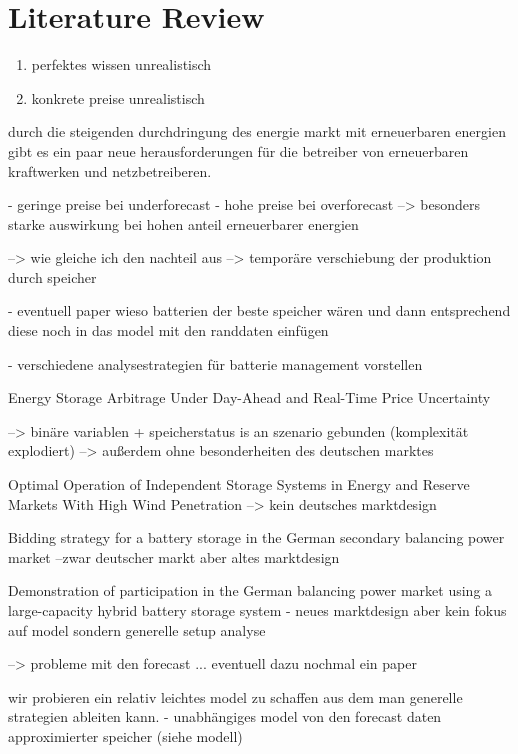 \chapter{Literature Review}
\begin{enumerate}
	\item perfektes wissen unrealistisch
	\item konkrete preise unrealistisch
\end{enumerate}

durch die steigenden durchdringung des energie markt mit erneuerbaren  energien gibt es ein paar neue herausforderungen für
die betreiber von erneuerbaren kraftwerken und netzbetreiberen.

- geringe preise bei underforecast
- hohe preise bei overforecast
--> besonders starke auswirkung bei hohen anteil erneuerbarer energien

--> wie gleiche ich den nachteil aus
--> temporäre verschiebung der produktion durch speicher

- eventuell paper wieso batterien der beste speicher wären und dann entsprechend diese noch in das model mit den  randdaten einfügen

- verschiedene analysestrategien für batterie management vorstellen

Energy Storage Arbitrage Under Day-Ahead and Real-Time Price Uncertainty

--> binäre variablen + speicherstatus is an szenario gebunden (komplexität explodiert)
--> außerdem ohne besonderheiten des deutschen marktes


Optimal Operation of Independent Storage Systems in Energy and Reserve Markets With High Wind Penetration
--> kein deutsches marktdesign

Bidding strategy for a battery storage in the German secondary balancing power market
--zwar deutscher markt aber altes marktdesign

Demonstration of participation in the German balancing
power market using a large-capacity hybrid battery
storage system
- neues marktdesign aber kein fokus auf model sondern generelle setup analyse

--> probleme mit den forecast	... eventuell dazu nochmal ein paper

wir probieren ein relativ leichtes model zu schaffen aus dem man generelle strategien ableiten kann.
- unabhängiges model von den forecast daten
approximierter speicher (siehe modell)




